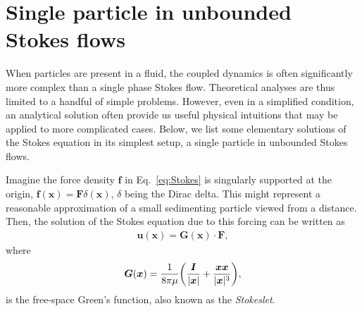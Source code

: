 \section{Single particle in unbounded Stokes flows}
\label{sec:single-p}

When particles are present in a fluid, the coupled dynamics is often significantly more complex than a single phase Stokes flow. Theoretical analyses are thus limited to a handful of simple problems. However, even in a simplified condition, an analytical solution often provide us useful physical intuitions that may be applied to more complicated cases. Below, we list some elementary solutions of the Stokes equation in its simplest setup, \ie a single particle in unbounded Stokes flows.

\bigskip
Imagine the force density ${\bm f}$ in Eq.\ \eqref{eq:Stokes} is singularly supported at the origin, \ie ${\bm f}({\bm x})={\bm F}\delta({\bm x})$, $\delta$ being the Dirac delta. This might represent a reasonable approximation of a small sedimenting particle viewed from a distance. Then, the solution of the Stokes equation due to this forcing can be written as
\begin{equation} \label{eq:stokes-green}
 \begin{aligned}
   {\bm u}({\bm x}) = {\bm G}({\bm x}) \cdot {\bm F},
 \end{aligned}
\end{equation}
where  
\begin{equation}
 \begin{aligned}
   {\bm G}({\bm x}) = \frac{1}{8\pi\mu } \bigg( \frac{{\bm I}}{\lvert\bm x\rvert}+\frac{ {\bm x}{\bm x} }{ \lvert{\bm x}\rvert^3 } \bigg),
 \end{aligned}
\end{equation}
is the free-space Green's function, also known as the \emph{Stokeslet}.

